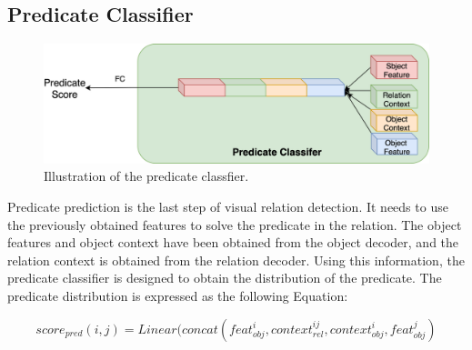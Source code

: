 


\subsection{Predicate Classifier}

 \begin{figure}[h]
	\centering
	\includegraphics[width=1\linewidth]{figures/predicate_classifer}
	\caption[Illustration of the predicate classfier]{Illustration of the predicate classfier.}
	\label{fig:predicateclassifer}
\end{figure}

Predicate prediction is the last step of visual relation detection. It needs to use the previously obtained features to solve the predicate in the relation. The object features and object context have been obtained from the object decoder, and the relation context is obtained from the relation decoder. Using this information, the predicate classifier is designed to obtain the distribution of the predicate. The predicate distribution is expressed as the following Equation:%

\begin{equation}
	score_{pred}(i,j) = Linear(concat(feat_{obj}^i, context_{rel}^{ij}, context_{obj}^i, feat_{obj}^j)
	\label{equ:predicatc}
\end{equation}


